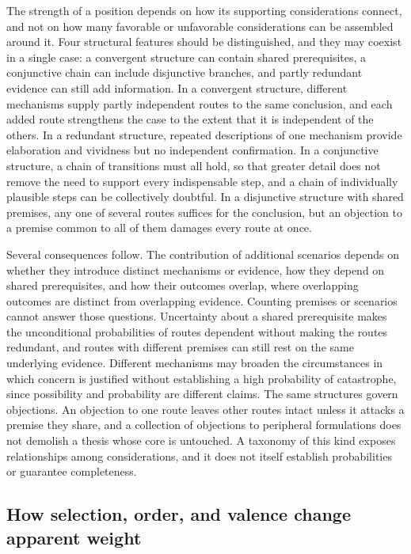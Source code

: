 \documentclass[11pt]{article}
\begin{document}
The strength of a position depends on how its supporting considerations connect, and not on how many favorable or unfavorable considerations can be assembled around it. Four structural features should be distinguished, and they may coexist in a single case: a convergent structure can contain shared prerequisites, a conjunctive chain can include disjunctive branches, and partly redundant evidence can still add information. In a convergent structure, different mechanisms supply partly independent routes to the same conclusion, and each added route strengthens the case to the extent that it is independent of the others. In a redundant structure, repeated descriptions of one mechanism provide elaboration and vividness but no independent confirmation. In a conjunctive structure, a chain of transitions must all hold, so that greater detail does not remove the need to support every indispensable step, and a chain of individually plausible steps can be collectively doubtful. In a disjunctive structure with shared premises, any one of several routes suffices for the conclusion, but an objection to a premise common to all of them damages every route at once.

Several consequences follow. The contribution of additional scenarios depends on whether they introduce distinct mechanisms or evidence, how they depend on shared prerequisites, and how their outcomes overlap, where overlapping outcomes are distinct from overlapping evidence. Counting premises or scenarios cannot answer those questions. Uncertainty about a shared prerequisite makes the unconditional probabilities of routes dependent without making the routes redundant, and routes with different premises can still rest on the same underlying evidence. Different mechanisms may broaden the circumstances in which concern is justified without establishing a high probability of catastrophe, since possibility and probability are different claims. The same structures govern objections. An objection to one route leaves other routes intact unless it attacks a premise they share, and a collection of objections to peripheral formulations does not demolish a thesis whose core is untouched. A taxonomy of this kind exposes relationships among considerations, and it does not itself establish probabilities or guarantee completeness.

\subsection{How selection, order, and valence change apparent weight}
\end{document}

